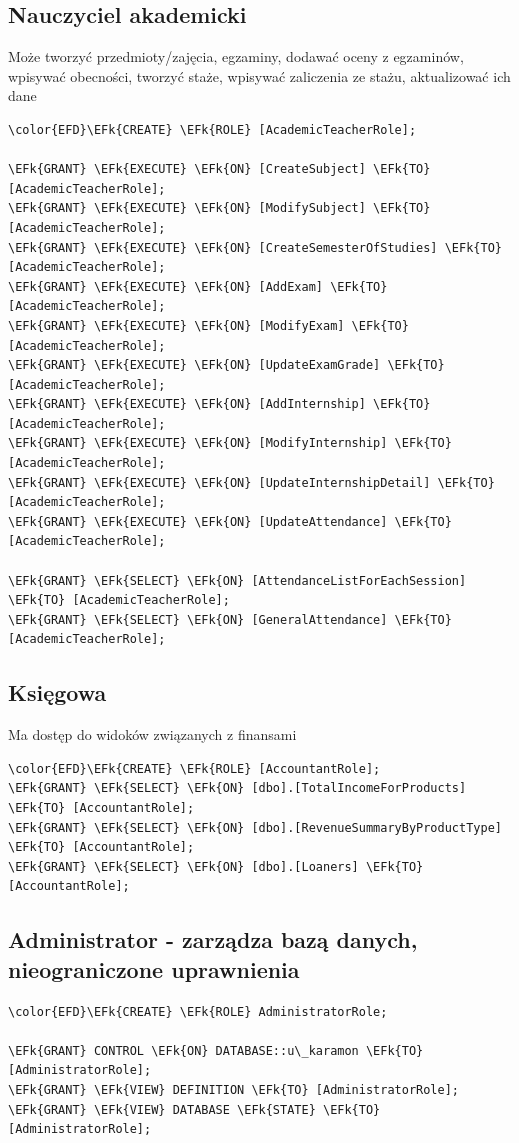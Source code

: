 \documentclass[11pt]{article}
\newcommand{\EFk}[1]{\textcolor{EFk}{\textbf{#1}}} %
\begin{document}
\subsection{Nauczyciel akademicki}
\label{sec:org5b42174}
Może tworzyć przedmioty/zajęcia, egzaminy, dodawać oceny z egzaminów, wpisywać obecności, tworzyć staże, wpisywać zaliczenia ze stażu, aktualizować ich dane
\begin{Code}
\begin{Verbatim}
\color{EFD}\EFk{CREATE} \EFk{ROLE} [AcademicTeacherRole];

\EFk{GRANT} \EFk{EXECUTE} \EFk{ON} [CreateSubject] \EFk{TO} [AcademicTeacherRole];
\EFk{GRANT} \EFk{EXECUTE} \EFk{ON} [ModifySubject] \EFk{TO} [AcademicTeacherRole];
\EFk{GRANT} \EFk{EXECUTE} \EFk{ON} [CreateSemesterOfStudies] \EFk{TO} [AcademicTeacherRole];
\EFk{GRANT} \EFk{EXECUTE} \EFk{ON} [AddExam] \EFk{TO} [AcademicTeacherRole];
\EFk{GRANT} \EFk{EXECUTE} \EFk{ON} [ModifyExam] \EFk{TO} [AcademicTeacherRole];
\EFk{GRANT} \EFk{EXECUTE} \EFk{ON} [UpdateExamGrade] \EFk{TO} [AcademicTeacherRole];
\EFk{GRANT} \EFk{EXECUTE} \EFk{ON} [AddInternship] \EFk{TO} [AcademicTeacherRole];
\EFk{GRANT} \EFk{EXECUTE} \EFk{ON} [ModifyInternship] \EFk{TO} [AcademicTeacherRole];
\EFk{GRANT} \EFk{EXECUTE} \EFk{ON} [UpdateInternshipDetail] \EFk{TO} [AcademicTeacherRole];
\EFk{GRANT} \EFk{EXECUTE} \EFk{ON} [UpdateAttendance] \EFk{TO} [AcademicTeacherRole];

\EFk{GRANT} \EFk{SELECT} \EFk{ON} [AttendanceListForEachSession] \EFk{TO} [AcademicTeacherRole];
\EFk{GRANT} \EFk{SELECT} \EFk{ON} [GeneralAttendance] \EFk{TO} [AcademicTeacherRole];
\end{Verbatim}
\end{Code}
\subsection{Księgowa}
\label{sec:orga23decc}
Ma dostęp do widoków związanych z finansami
\begin{Code}
\begin{Verbatim}
\color{EFD}\EFk{CREATE} \EFk{ROLE} [AccountantRole];
\EFk{GRANT} \EFk{SELECT} \EFk{ON} [dbo].[TotalIncomeForProducts] \EFk{TO} [AccountantRole];
\EFk{GRANT} \EFk{SELECT} \EFk{ON} [dbo].[RevenueSummaryByProductType] \EFk{TO} [AccountantRole];
\EFk{GRANT} \EFk{SELECT} \EFk{ON} [dbo].[Loaners] \EFk{TO} [AccountantRole];
\end{Verbatim}
\end{Code}
\subsection{Administrator - zarządza bazą danych, nieograniczone uprawnienia}
\label{sec:org5674ffc}
\begin{Code}
\begin{Verbatim}
\color{EFD}\EFk{CREATE} \EFk{ROLE} AdministratorRole;

\EFk{GRANT} CONTROL \EFk{ON} DATABASE::u\_karamon \EFk{TO} [AdministratorRole];
\EFk{GRANT} \EFk{VIEW} DEFINITION \EFk{TO} [AdministratorRole];
\EFk{GRANT} \EFk{VIEW} DATABASE \EFk{STATE} \EFk{TO} [AdministratorRole];
\end{Verbatim}
\end{Code}
\end{document}
